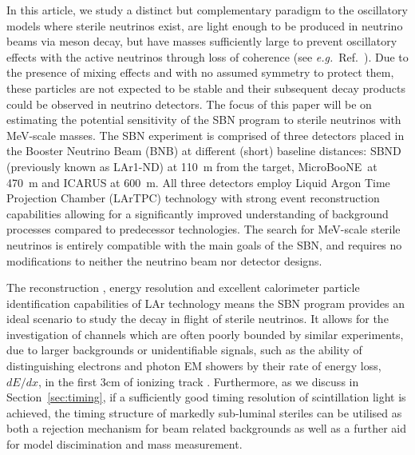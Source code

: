 \documentclass[11pt, a4paper]{article}
\newcommand{\refsec}[1]{Section~\ref{#1}}
\newcommand{\refref}[1]{Ref.~\cite{#1}}
\def\eg{\emph{e.g.}}
\def\muboone{MicroBooNE}
\newcounter{CommentCount}
\newcommand{\marcom}[2]{\textsuperscript{\textcolor{#1}{\theCommentCount}}\marginpar{\textsuperscript{\textcolor{#1}{\theCommentCount}}\textcolor{#1}{{\small#1: #2}}}\stepcounter{CommentCount}}
\begin{document}
In this article, we study a distinct but complementary paradigm to the
oscillatory models where sterile neutrinos exist, are light enough to be
produced in neutrino beams via meson decay, but have masses sufficiently large
to prevent oscillatory effects with the active neutrinos through loss of
coherence (see \eg\ \refref{Akhmedov:2009rb}). Due to the presence of mixing
effects and with no assumed symmetry to protect them, these particles are not
expected to be stable and their subsequent decay products could be observed in
neutrino detectors.
%
%
The focus of this paper will be on estimating the potential sensitivity of the
SBN program to sterile neutrinos with MeV-scale masses.
%
The SBN experiment is comprised of three detectors placed in the Booster
Neutrino Beam (BNB) at different (short) baseline distances: SBND (previously
known as LAr1-ND) at 110~m from the target, \muboone\ at 470~m and ICARUS at
600~m.  All three detectors employ Liquid Argon Time Projection Chamber
(LArTPC) technology \cite{Rubbia:1977} with strong event reconstruction
capabilities allowing for a significantly improved understanding of background
processes compared to predecessor technologies. 
%
The search for MeV-scale sterile neutrinos is entirely compatible with the main
goals of the SBN, and requires no modifications to neither the neutrino beam nor
detector designs. 
%
%
%

The reconstruction \cite{Church:2013hea, Marshall:2015rfa}, energy resolution
\cite{Sorel:2014rka} and excellent calorimeter particle identification
capabilities of LAr \cite{Antonello:2012hu} technology means the SBN program
provides an ideal scenario to study the decay in flight of sterile neutrinos.
It allows for the investigation of channels which are often poorly bounded by
similar experiments, due to larger backgrounds or unidentifiable signals, such
as the ability of distinguishing electrons and photon EM showers by their rate
of energy loss, $dE/dx$, in the first 3cm of ionizing track \cite{szelc:2007}.
Furthermore, as we discuss in \refsec{sec:timing}, if a sufficiently good timing
resolution of scintillation light is achieved, the timing structure of markedly
sub-luminal steriles can be utilised as both a rejection mechanism for beam
related backgrounds as well as a further aid for model discimination and mass
measurement.
\end{document}
